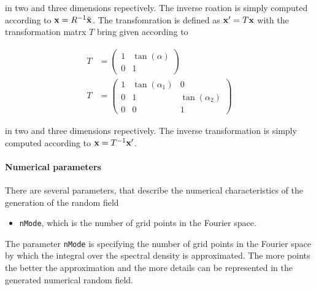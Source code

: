 \documentclass[12pt]{report}
\begin{document}
in two and three dimensions repectively. The inverse roation is simply computed according to ${\bf x} = R^{-1} \tilde{{\bf x}}$. The transfomration is defined as ${\bf x}' = T {\bf x}$ with the transformation matrx $T$ bring given according to 

\begin{subequations}
\begin{align}
	T & = \left( \begin{array}{cc} 1 & \tan(\alpha) \\ 0 & 1 \end{array} \right) \\
	T & = \left( \begin{array}{ccc} 1 & \tan(\alpha_1) & 0 \\ 0 & 1 & \tan(\alpha_2)  \\ 0 & 0 & 1 \end{array} \right)
\end{align}
\end{subequations}

in two and three dimensions repectively. The inverse transformation is simply computed according to ${\bf x} = T^{-1} {\bf x}'$.
 
\paragraph{Numerical parameters}

There are several parameters, that describe the numerical characteristics of the generation of the random field

\begin{itemize}
	\item {\tt nMode}, which is the number of grid points in the Fourier space.
\end{itemize}

The parameter {\tt nMode} is specifying the number of grid points in the Fourier space by which the integral over the spectral density is approximated. The more points the better the approximation and the more details can be represented in the generated numerical random field.
\end{document}
